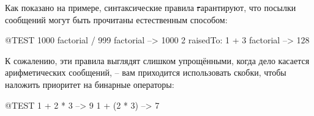 \documentclass[a4paper,10pt,twoside]{book}
\begin{document}

Как показано на примере, синтаксические правила \st гарантируют, что посылки сообщений могут быть прочитаны естественным способом:
\begin{code}{@TEST}
1000 factorial / 999 factorial --> 1000
2 raisedTo: 1 + 3 factorial     --> 128
\end{code}
\noindent

К сожалению, эти правила выглядят слишком упрощёнными, когда дело касается арифметических сообщений, -- вам приходится использовать скобки, чтобы наложить приоритет на бинарные операторы:
\begin{code}{@TEST}
1 + 2 * 3   --> 9
1 + (2 * 3) --> 7
\end{code}
\end{document}
